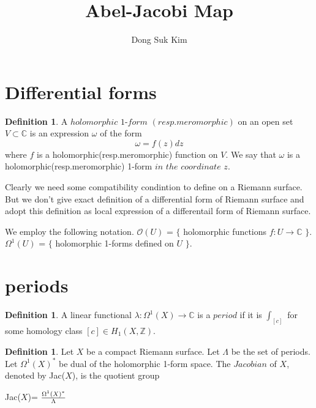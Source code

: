 \documentclass[11pt]{amsart}
\theoremstyle{definition}
\newtheorem{defn}[thm]{Definition}
\begin{document}
\title[]
{Abel-Jacobi Map}
\author{Dong Suk Kim}

\maketitle


\section{Differential forms}

\begin{defn} A $holomorphic$ $1$-$form$ $(resp. meromorphic)$ on an open set $V \subset \mathbb{C}$ is an expression $\omega$ of the form 
\begin{equation*} \omega=f(z)dz
\end{equation*}
where $f$ is a holomorphic(resp.meromorphic) function on $V$. We say that $\omega$ is a holomorphic(resp.meromorphic) 1-form $in$ $the$ $coordinate$ $z$.

\end{defn}
\vspace{1ex}
 Clearly we need some compatibility condintion to define on a Riemann surface. But we don't give exact definition of a differential form of Riemann surface and adopt this definition as local expression of a differentail form of Riemann surface.

\vspace{2ex}
 We employ the following notation.
\vspace{2ex} 
\newline $\mathcal{O}(U)$ = $\{$ holomorphic functions $f : U \to \mathbb{C}$ $\}$.
\newline $\Omega^{1}(U)$ = $\{$ holomorphic 1-forms defined on $U$ $\}$.
\vspace{3ex}

\section{periods}

\begin{defn}
A linear functional $\lambda : \Omega^{1}(X) \to \mathbb{C}$ is a $period$ if it is $\int_{[c]}$ for some homology class $[c] \in H_1(X,\mathbb{Z})$.
\end{defn}

\begin{defn} Let $X$ be a compact Riemann surface. Let $\Lambda$ be the set of periods. Let $\Omega^{1}(X)^{*}$ be dual of the holomorphic 1-form space. The $Jacobian$ of $X$, denoted by Jac($X$), is the quotient group 

\begin{center}

Jac($X$)= ${ \Omega^{1}(X)^{*} \over \Lambda}$
\end{center} 

\end{defn}
\end{document}
